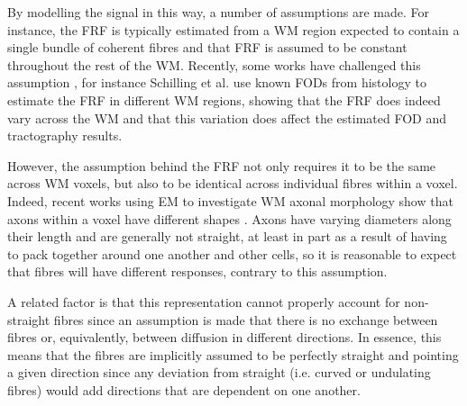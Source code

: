 By modelling the signal in this way, a number of assumptions are made. For instance, the \ac{FRF} is typically estimated from a \ac{WM} region expected to contain a single bundle of coherent fibres and that \ac{FRF} is assumed to be constant throughout the rest of the \ac{WM}.
Recently, some works have challenged this assumption \cite{Novikov2019,Schilling2019,Christiaens2020}, for instance Schilling et al. \cite{Schilling2019} use known \acs{FOD}s from histology to estimate the \ac{FRF} in different WM regions, showing that the \ac{FRF} does indeed vary across the \ac{WM} and that this variation does affect the estimated \ac{FOD} and tractography results.

However, the assumption behind the \ac{FRF} not only requires it to be the same across WM voxels, but also to be identical across individual fibres within a voxel.
Indeed, recent works using \ac{EM} to investigate \ac{WM} axonal morphology show that axons within a voxel have different shapes \cite{Lee2019b,Abdollahzadeh2019}. Axons have varying diameters along their length and are generally not straight, at least in part as a result of having to pack together around one another and other cells, so it is reasonable to expect that fibres will have different responses, contrary to this assumption.

A related factor is that this representation cannot properly account for non-straight fibres since an assumption is made that there is no exchange between fibres or, equivalently, between diffusion in different directions. In essence, this means that the fibres are implicitly assumed to be perfectly straight and pointing a given direction since any deviation from straight (i.e. curved or undulating fibres) would add directions that are dependent on one another.


